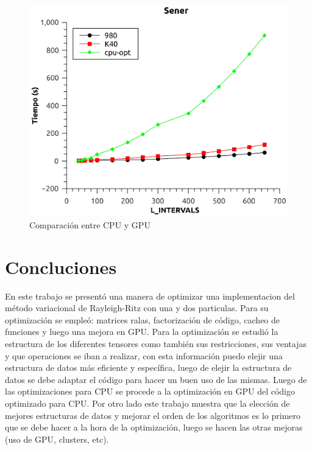\documentclass[a4paper,openright,12pt, oneside]{book}
\begin{document}
\begin{figure}[!htbp]
  \begin{center}
    \leavevmode
 
    \includegraphics[scale=0.8]{cpu_vs_gpu.eps}

    \caption{Comparaci\'on entre CPU y GPU}

    \label{graph:cpu_vs_gpu}
  \end{center}
\end{figure}



\setcounter{chapter}{6}
\setcounter{section}{0}
\chapter*{Concluciones}\label{Concluciones}
\markboth{}{} %

En este trabajo se present\'o una manera de optimizar una implementacion del m\'etodo variacional de Rayleigh-Ritz con una y dos particulas.
Para su optimizaci\'on se emple\'o: matrices ralas, factorizaci\'on de c\'odigo, cacheo de funciones y luego una mejora en GPU.
Para la optimizaci\'on se estudi\'o la estructura de los diferentes tensores como tambi\'en sus restricciones, sus ventajas y que operaciones se iban a realizar, con esta informaci\'on puedo elejir una estructura de datos m\'as eficiente y espec\'ifica, luego de elejir la estructura de datos se debe adaptar el c\'odigo para hacer un buen uso de las mismas.
Luego de las optimizaciones para CPU se procede a la optimizaci\'on en GPU del c\'odigo optimizado para CPU.
Por otro lado este trabajo muestra que la elecci\'on de mejores estructuras de datos y mejorar el orden de los algoritmos es lo primero que se debe hacer a la hora de la optimizaci\'on, luego se hacen las otras mejoras (uso de GPU, clusters, etc).
\end{document}
